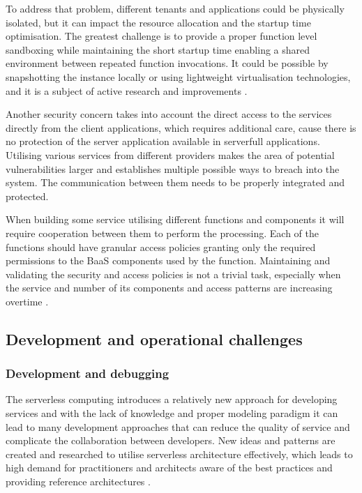 To address that problem, different tenants and applications could be physically isolated, but it can impact the resource allocation and the startup time optimisation. The greatest challenge is to provide a proper function level sandboxing while maintaining the short startup time enabling a shared environment between repeated function invocations. It could be possible by snapshotting the instance locally or using lightweight virtualisation technologies, and it is a subject of active research and improvements \cite{BerkeleyServerless}.

Another security concern takes into account the direct access to the services directly from the client applications, which requires additional care, cause there is no protection of the server application available in serverfull applications. Utilising various services from different providers makes the area of potential vulnerabilities larger and establishes multiple possible ways to breach into the system. The communication between them needs to be properly integrated and protected.

When building some service utilising different functions and components it will require cooperation between them to perform the processing. Each of the functions should have granular access policies granting only the required permissions to the BaaS components used by the function. Maintaining and validating the security and access policies is not a trivial task, especially when the service and number of its components and access patterns are increasing overtime \cite{MartinFowlerServerless}.

\subsection{Development and operational challenges}

\subsubsection*{Development and debugging}

The serverless computing introduces a relatively new approach for developing services and with the lack of knowledge and proper modeling paradigm it can lead to many development approaches that can reduce the quality of service and complicate the collaboration between developers. New ideas and patterns are created and researched to utilise serverless architecture effectively, which leads to high demand for practitioners and architects aware of the best practices and providing reference architectures \cite{ServerlessComputingSurveyOfOpportunitiesChallengesApplications}.

